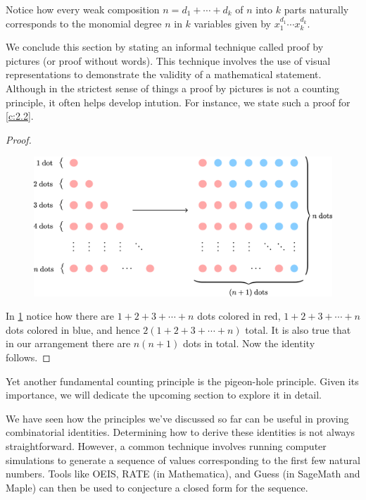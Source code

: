 \begin{remark}
Notice how every weak composition $n=d_1+\cdots+d_k$ of $n$ into $k$ parts naturally corresponds to the monomial degree $n$ in $k$ variables given by $x_1^{d_1}\cdots x_k^{d_k}$.
\end{remark}
We conclude this section by stating an informal technique called proof by pictures (or proof without words). This technique involves the use of visual representations to demonstrate the validity of a mathematical statement. Although in the strictest sense of things a proof by pictures is not a counting principle, it often helps develop intution. For instance, we state such a proof for \cref{c:2.2}. 
\begin{proof} 
	\begin{figure}[H]	\includegraphics[scale=0.65]{Images/Figure9.png}
		\caption{}
		\label{f:1.9}
	\end{figure}
In \cref{f:1.9} notice how there are $1+2+3+\cdots+n$ dots colored in red, $1+2+3+\cdots+n$ dots colored in blue, and hence $2\left( 1+2+3+\cdots+n \right)$ total. It is also true that in our arrangement there are $n\left( n+1 \right)$ dots in total. Now the identity follows.
\end{proof}
Yet another fundamental counting principle is the pigeon-hole principle. Given its importance, we will dedicate the upcoming section to explore it in detail.
\begin{remark}
We have seen how the principles we’ve discussed so far can be useful in proving combinatorial identities. Determining how to derive these identities is not always straightforward. However, a common technique involves running computer simulations to generate a sequence of values corresponding to the first few natural numbers. Tools like OEIS, RATE (in Mathematica), and Guess (in SageMath and Maple) can then be used to conjecture a closed form for the sequence.
\end{remark}

